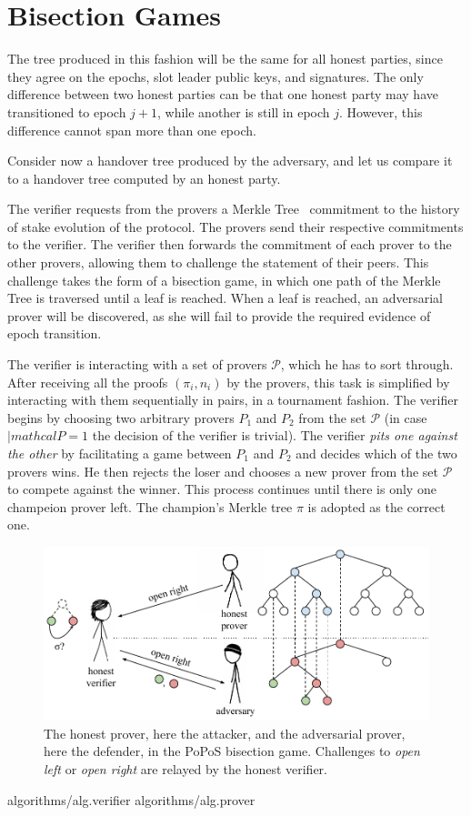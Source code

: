 \section{Bisection Games}

The tree produced in this fashion will be the same for all honest parties, since they agree on
the epochs, slot leader public keys, and signatures. The only difference between two honest parties
can be that one honest party may have transitioned to epoch $j+1$, while another is still in epoch
$j$. However, this difference cannot span more than one epoch.

Consider now a handover tree produced by the adversary, and let us compare it to a handover tree
computed by an honest party. 

The verifier requests from
the provers a Merkle Tree~\cite{merkle} commitment to the history of stake evolution of
the protocol. The provers send their respective commitments to the verifier. The verifier
then forwards the commitment of each prover to the other provers, allowing them to
challenge the statement of their peers. This challenge takes the form of a bisection
game, in which one path of the Merkle Tree is traversed until a leaf is reached.
When a leaf is reached, an adversarial prover will be discovered, as she will fail to provide
the required evidence of epoch transition. 

The verifier
is interacting with a set of provers $\mathcal{P}$, which he has to sort through.
After receiving all the proofs $(\pi_i, n_i)$ by the provers,
this task is simplified by interacting with them sequentially in pairs,
in a tournament fashion. The verifier
begins by choosing two arbitrary provers $P_1$ and $P_2$ from the set $\mathcal{P}$
(in case $|mathcal{P} = 1$ the decision of the verifier is trivial). The
verifier \emph{pits one against the other} by facilitating a game between
$P_1$ and $P_2$ and decides which of the
two provers wins. He then rejects the loser and chooses a new prover from the
set $\mathcal{P}$ to compete against the winner. This process continues until
there is only one champeion prover left. The champion's Merkle tree $\pi$ is adopted
as the correct one.

\begin{figure}[h]
    \centering
    \includegraphics[width=0.55 \textwidth,keepaspectratio]{figures/bisection-game.pdf}
    \caption{The honest prover, here the attacker, and the adversarial prover,
             here the defender, in the PoPoS bisection game. Challenges to \emph{open
             left} or \emph{open right} are relayed by the honest verifier.}
    \label{fig.bisection-game}
\end{figure}

{algorithms/alg.verifier}
{algorithms/alg.prover}
